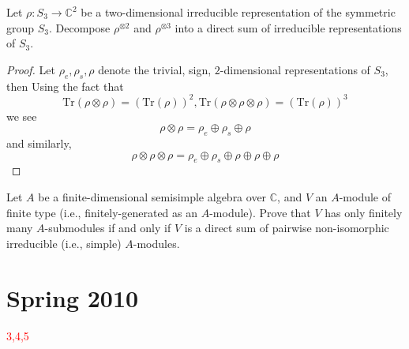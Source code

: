 \documentclass[openany]{book}
\begin{document}
\begin{prob}
    Let \(\rho:S_3\to\mathbb{C}^2\) be a two-dimensional irreducible representation of the symmetric group \(S_3\). Decompose \(\rho^{\otimes 2}\) and \(\rho^{\otimes 3}\) into a direct sum of irreducible representations of \(S_3\).
\end{prob}
\begin{proof}
    Let $\rho_e, \rho_s, \rho$ denote the trivial, sign, $2$-dimensional representations of $S_3$, then
    Using the fact that 
    \begin{equation*}
        \text{Tr}(\rho\otimes\rho)=(\text{Tr}(\rho))^2, \text{Tr}(\rho\otimes\rho\otimes\rho)=(\text{Tr}(\rho))^3
    \end{equation*}
    we see 
    \begin{equation*}
        \rho\otimes\rho= \rho_e\oplus\rho_s\oplus\rho
    \end{equation*}
    and similarly, 
    \begin{equation*}
        \rho\otimes\rho\otimes\rho=\rho_{e}\oplus\rho_s\oplus\rho\oplus\rho\oplus\rho
    \end{equation*}
\end{proof}


\begin{prob}
    Let \(A\) be a finite-dimensional semisimple algebra over \(\mathbb{C}\), and \(V\) an \(A\)-module of finite type (i.e., finitely-generated as an \(A\)-module). Prove that \(V\) has only finitely many \(A\)-submodules if and only if \(V\) is a direct sum of pairwise non-isomorphic irreducible (i.e., simple) \(A\)-modules.
\end{prob}



\chapter{Spring 2010}


\textcolor{red}{3,4,5}
\end{document}
